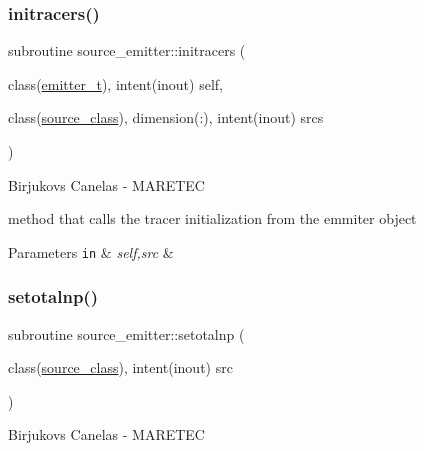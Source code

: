 \subsubsection{\texorpdfstring{initracers()}{initracers()}}
{\footnotesize\ttfamily subroutine source\+\_\+emitter\+::initracers (\begin{DoxyParamCaption}\item[{class(\mbox{\hyperlink{structsource__emitter_1_1emitter__t}{emitter\+\_\+t}}), intent(inout)}]{self,  }\item[{class(\mbox{\hyperlink{structsource__identity_1_1source__class}{source\+\_\+class}}), dimension(\+:), intent(inout)}]{srcs }\end{DoxyParamCaption})\hspace{0.3cm}{\ttfamily [private]}}



Birjukovs Canelas -\/ M\+A\+R\+E\+T\+EC 

method that calls the tracer initialization from the emmiter object 
\begin{DoxyParams}[1]{Parameters}
\mbox{\tt in}  & {\em self,src} & \\
\hline
\end{DoxyParams}
\mbox{\label{namespacesource__emitter_a73d054a39fc1fccfde74173a5c7f2c58}} 
\subsubsection{\texorpdfstring{setotalnp()}{setotalnp()}}
{\footnotesize\ttfamily subroutine source\+\_\+emitter\+::setotalnp (\begin{DoxyParamCaption}\item[{class(\mbox{\hyperlink{structsource__identity_1_1source__class}{source\+\_\+class}}), intent(inout)}]{src }\end{DoxyParamCaption})\hspace{0.3cm}{\ttfamily [private]}}



Birjukovs Canelas -\/ M\+A\+R\+E\+T\+EC 

